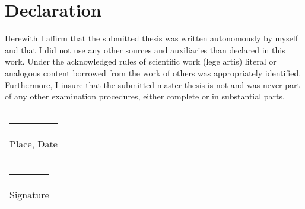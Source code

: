\section*{Declaration}
Herewith I affirm that the submitted thesis was written autonomously by
myself and that I did not use any other sources and auxiliaries than declared in
this work. Under the acknowledged rules of scientific work (lege artis) literal or
analogous content borrowed from the work of others was appropriately
identified. Furthermore, I insure that the submitted master thesis is not and was
never part of any other examination procedures, either complete or in substantial
parts.

\vspace{3cm}

\hfill
\begin{tabular}[t]{c}
    \rule{17em}{0.4pt}\\Place, Date
\end{tabular}
\hfill
\begin{tabular}[t]{c}
    \rule{17em}{0.4pt}\\Signature
\end{tabular}
\hfill
